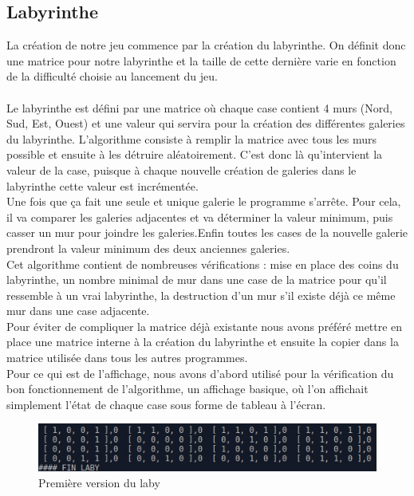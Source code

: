 \documentclass[12pt,a4paper,twoside]{article}
\begin{document}
\subsection{Labyrinthe}
La création de notre jeu commence par la création du labyrinthe. On définit donc une matrice pour notre labyrinthe et la taille de cette dernière varie en fonction de la difficulté choisie au lancement du jeu.
\\
\\
Le labyrinthe est défini par une matrice où chaque case contient 4 murs (Nord, Sud, Est, Ouest) et une valeur qui servira pour la création des différentes galeries du labyrinthe. L’algorithme consiste à remplir la matrice avec tous les murs possible et ensuite à les détruire aléatoirement. C’est donc là qu’intervient la valeur de la case, puisque à chaque nouvelle création de galeries dans le labyrinthe cette valeur est incrémentée. 
\\Une fois que ça fait une seule et unique galerie le programme s’arrête. Pour cela, il va comparer les galeries adjacentes et va déterminer la valeur minimum, puis casser un mur pour joindre les galeries.Enfin toutes les cases de la nouvelle galerie prendront la valeur minimum des deux anciennes galeries.\\
Cet algorithme contient de nombreuses vérifications : mise en place des coins du labyrinthe, un nombre minimal de mur dans une case de la matrice pour qu’il ressemble à un vrai labyrinthe, la destruction d’un mur s’il existe déjà ce même mur dans une case adjacente. 
\\Pour éviter de compliquer la matrice déjà existante nous avons préféré mettre en place une matrice interne à la création du labyrinthe et ensuite la copier dans la matrice utilisée dans tous les autres programmes.\\
Pour ce qui est de l’affichage, nous avons d’abord utilisé pour la vérification du bon fonctionnement de l’algorithme, un affichage basique, où l’on affichait simplement l’état de chaque case sous forme de tableau à l’écran.\\
\begin{figure}[h]
\centering
\includegraphics[width=1\textwidth]{laby_prem.png}
\caption{Première version du laby}
\end{figure}
\\
\end{document}
